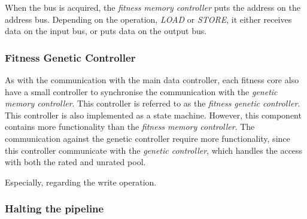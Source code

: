 When the bus is acquired, the \emph{fitness memory controller} puts the address on the address bus. Depending on the operation, \emph{LOAD} or \emph{STORE}, it either receives data on the input bus, or puts data on the output bus. 




\subsubsection{Fitness Genetic Controller} 
As with the communication with the main data controller, each fitness core also have a small controller to synchronise the communication with the \emph{genetic memory controller}. This controller is referred to as the \emph{fitness genetic controller}. This controller is also implemented as a state machine. However, this component contains more functionality than the \emph{fitness memory controller}. The communication against the genetic controller require more functionality, since this controller communicate with the \emph{genetic controller}, which handles the access with both the rated and unrated pool. 














Especially, regarding the write operation.  








\subsubsection{Halting the pipeline}




